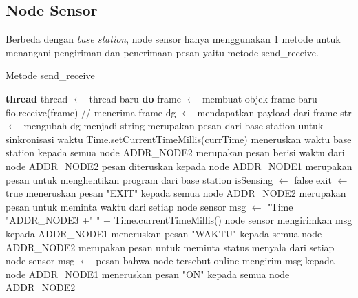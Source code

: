 \subsection{Node Sensor}
Berbeda dengan \textit{base station}, node sensor hanya menggunakan 1 metode untuk menangani pengiriman dan penerimaan pesan yaitu metode send\_receive.
\begin{algorithm}[htbp]
\caption{Metode send\_receive}
\begin{algorithmic}[1]
    \State \textbf{thread} thread $\leftarrow$ thread baru \textbf{do}
        \Indent
                \State frame $\leftarrow$ membuat objek frame baru
                    \try
                        \State fio.receive(frame) // menerima frame
                        \State dg $\leftarrow$ mendapatkan payload dari frame
                        \State str $\leftarrow$ mengubah dg menjadi string
                            \State merupakan pesan dari base station untuk sinkronisasi waktu
                            \State Time.setCurrentTimeMillis(currTime)
                                \State meneruskan waktu base station kepada semua node ADDR\_NODE2
                            \EndIf
                            \State merupakan pesan berisi waktu dari node ADDR\_NODE2
                            \State pesan diteruskan kepada node ADDR\_NODE1
                            \State merupakan pesan untuk menghentikan program dari base station
                            \State isSensing $\leftarrow$ false
                            \State exit $\leftarrow$ true
                                \State meneruskan pesan "EXIT" kepada semua node ADDR\_NODE2
                            \EndIf
                            \State merupakan pesan untuk meminta waktu dari setiap node sensor
                            \State msg $\leftarrow$ "Time "ADDR\_NODE3 +" " + Time.currentTimeMillis()
                            \State node sensor mengirimkan msg kepada ADDR\_NODE1
                                \State meneruskan pesan "WAKTU" kepada semua node ADDR\_NODE2
                            \EndIf
                            \State merupakan pesan untuk meminta status menyala dari setiap node sensor
                            \State msg $\leftarrow$ pesan bahwa node tersebut online
                            \State mengirim msg kepada node ADDR\_NODE1
                                \State meneruskan pesan "ON" kepada semua node ADDR\_NODE2
                            \EndIf
{}
\end{algorithmic}
\end{algorithm}

